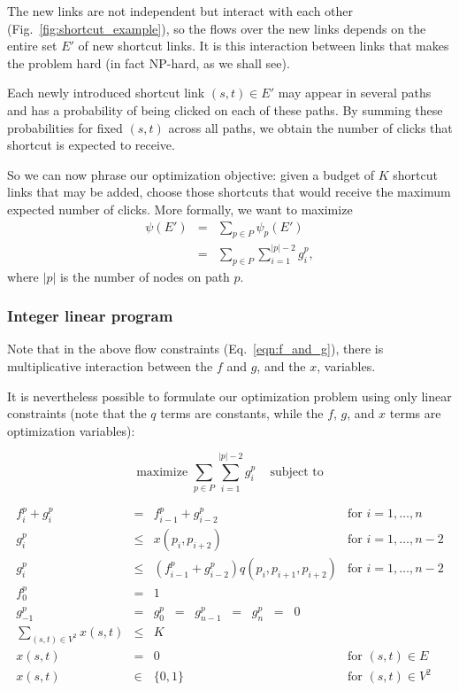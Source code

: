 \documentclass[11pt,letterpaper]{article}
\begin{document}
The new links are not independent but interact with each other (Fig.~\ref{fig:shortcut_example}), so the flows over the new links depends on the entire set $E'$ of new shortcut links.
It is this interaction between links that makes the problem hard (in fact NP-hard, as we shall see).

Each newly introduced shortcut link $(s,t) \in E'$ may appear in several paths and has a probability of being clicked on each of these paths.
By summing these probabilities for fixed $(s,t)$ across all paths, we obtain the number of clicks that shortcut is expected to receive.

So we can now phrase our optimization objective: given a budget of $K$ shortcut links that may be added, choose those shortcuts that would receive the maximum expected number of clicks.
More formally, we want to maximize
\begin{eqnarray}
\psi(E') &=& \sum_{p \in P} \psi_p(E') \\
&=& \sum_{p \in P} \sum_{i=1}^{|p|-2} g^p_i,
\end{eqnarray}
where $|p|$ is the number of nodes on path $p$.





\subsubsection*{Integer linear program}

Note that in the above flow constraints (Eq.~\ref{eqn:f_and_g}), there is multiplicative interaction between the $f$ and $g$, and the $x$, variables.

It is nevertheless possible to formulate our optimization problem using only linear constraints (note that the $q$ terms are constants, while the $f$, $g$, and $x$ terms are optimization variables):

\begin{equation}
\text{maximize } \sum_{p \in P} \sum_{i=1}^{|p|-2} g^p_i \;\;\; \text{ subject to}
\label{eqn:ILP_objective}
\end{equation}

\begin{equation}
\begin{array}{rlll}
f^p_i + g^p_i &=& f^p_{i-1} + g^p_{i-2} & \mbox{for $i=1,\dots,n$} \\
g^p_i &\leq& x(p_i, p_{i+2}) & \mbox{for $i=1,\dots,n-2$} \\
g^p_i &\leq& \left(f^p_{i-1} + g^p_{i-2}\right) q(p_i,p_{i+1},p_{i+2}) & \mbox{for $i=1,\dots,n-2$} \\
f^p_0 &=& 1 & \\
g^p_{-1} &=& g^p_0 \;\;=\;\; g^p_{n-1} \;\;=\;\; g^p_n \;\;=\;\; 0 & \\
\sum_{(s,t) \in V^2} x(s,t) &\leq& K &  \\
x(s,t) &=& 0 & \mbox{for $(s,t) \in E$} \\
x(s,t) &\in& \{0,1\} & \mbox{for $(s,t) \in V^2$} \\
\end{array}
\label{eqn:ILP_constraints}
\end{equation}
\end{document}
